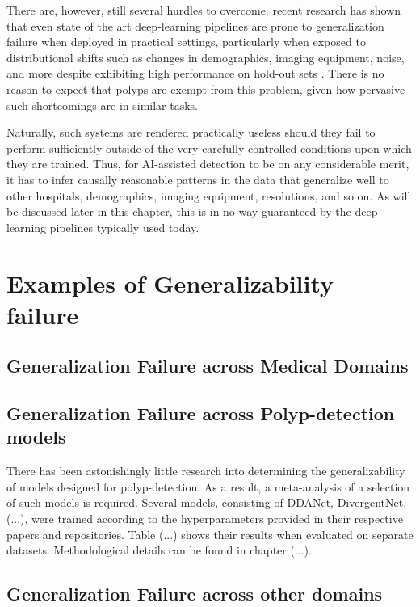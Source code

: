 	
	There are, however, still several hurdles to overcome; recent research has shown that even state of the art deep-learning pipelines are prone to generalization failure when deployed in practical settings, particularly when exposed to distributional shifts such as changes in demographics, imaging equipment, noise, and more despite exhibiting high performance on hold-out sets \cite{retinopathy, damour2020underspecification}. There is no reason to expect that polyps are exempt from this problem, given how pervasive such shortcomings are in similar tasks.
	
	Naturally, such systems are rendered practically useless should they fail to perform sufficiently outside of the very carefully controlled conditions upon which they are trained. Thus, for AI-assisted detection to be on any considerable merit, it has to infer causally reasonable patterns in the data that generalize well to other hospitals, demographics, imaging equipment, resolutions, and so on. As will be discussed later in this chapter, this is in no way guaranteed by the deep learning pipelines typically used today. 

\section{Examples of Generalizability failure}
	
	\subsection{Generalization Failure across Medical Domains}
	\subsection{Generalization Failure across Polyp-detection models}
		There has been astonishingly little research into determining the generalizability of models designed for polyp-detection. As a result, a meta-analysis of a selection of such models is required. Several models, consisting of DDANet, DivergentNet, (...), were trained according to the hyperparameters provided in their respective papers and repositories. Table (...) shows their results when evaluated on separate datasets. Methodological details can be found in chapter (...). 
	\subsection{Generalization Failure across other domains}
	
